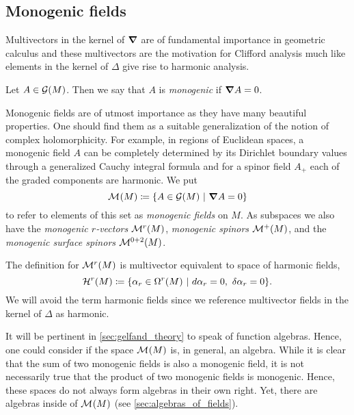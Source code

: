 \subsection{Monogenic fields}
Multivectors in the kernel of $\boldsymbol{\nabla}$ are of fundamental importance in geometric calculus and these multivectors are the motivation for Clifford analysis much like elements in the kernel of $\Delta$ give rise to harmonic analysis. 
\begin{definition}
 Let $A\in \mathcal{G}(M)$. Then we say that $A$ is \emph{monogenic} if $\boldsymbol{\nabla} A =0$.
\end{definition}

Monogenic fields are of utmost importance as they have many beautiful properties. One should find them as a suitable generalization of the notion of complex holomorphicity. For example, in regions of Euclidean spaces, a monogenic field $A$ can be completely determined by its Dirichlet boundary values through a generalized Cauchy integral formula and for a spinor field $A_+$ each of the graded components are harmonic. We put 
\begin{equation}
\mathcal{M}^{}(M)\coloneqq \{A \in \mathcal{G}(M) ~\vert~ \boldsymbol{\nabla} A =0\}
\end{equation}
to refer to elements of this set as \emph{monogenic fields} on $M$. As subspaces we also have the \emph{monogenic $r$-vectors} $\mathcal{M}^{r}(M)$, \emph{monogenic spinors} $\mathcal{M}^{+}(M)$, and the \emph{monogenic surface spinors} $\mathcal{M}^{0+2}(M)$. 

\begin{remark}
The definition for $\mathcal{M}^{r}(M)$ is multivector equivalent to space of harmonic fields,
    \begin{equation}
        \mathcal{H}^{r}(M)\coloneqq \{\alpha_r \in \Omega^{r}(M) ~\vert~ d \alpha_r = 0, ~ \delta \alpha_r = 0\}.
    \end{equation}
We will avoid the term harmonic fields since we reference multivector fields in the kernel of $\Delta$ as harmonic.
\end{remark}

It will be pertinent in \cref{sec:gelfand_theory} to speak of function algebras. Hence, one could consider if the space $\mathcal{M}^{}(M)$ is, in general, an algebra. While it is clear that the sum of two monogenic fields is also a monogenic field, it is not necessarily true that the product of two monogenic fields is monogenic. Hence, these spaces do not always form algebras in their own right. Yet, there are algebras inside of $\mathcal{M}^{}(M)$ (see \cref{sec:algebras_of_fields}).

